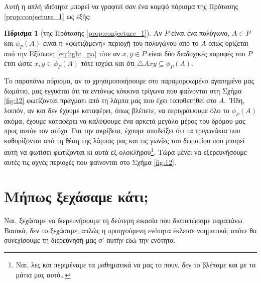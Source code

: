\documentclass[11pt,a4paper]{article}
\theoremstyle{definition}
\newtheorem{cor}{Πόρισμα}[section]
\begin{document}
	Αυτή η απλή ιδιότητα μπορεί να γραφτεί σαν ένα κομψό πόρισμα της Πρότασης \ref{prop:conjecture_1} ως εξής:
	\begin{cor}[της Πρότασης \ref{prop:conjecture_1}]\label{cor:conjecture_1}
		Αν $P$ είναι ένα πολύγωνο, $A\in P$ και $\phi_P(A)$ είναι η «φωτιζόμενη» περιοχή του πολυγώνου από το $A$ όπως ορίζεται από την Εξίσωση \eqref{eq:light_pa} τότε αν $x,y\in P$ είναι δύο διαδοχικές κορυφές του $P$ έτσι ώστε $x,y\in\phi_P(A)$ τότε ισχύει και ότι $\triangle Axy\subseteq\phi_P(A)$.
	\end{cor}
	
	Το παραπάνω πόρισμα, αν το χρησιμοποιήσουμε στο παραμορφωμένο αγαπημένο μας δωμάτιο, μας εγγυάται ότι τα εντόνως κόκκινα τρίγωνα που φαίνονται στη Σχήμα \ref{fig:12} φωτίζονται πράγματι από τη λάμπα μας που έχει τοποθετηθεί στο $A$. 'Ηδη, λοιπόν, αν και δεν έχουμε καταφέρει, όπως βλέπετε, να περιγράψουμε όλο το $\phi_P(A)$ ακόμα, έχουμε καταφέρει να καλύψουμε ένα αρκετά μεγάλο μέρος του δρόμου μας προς αυτόν τον στόχο. Για την ακρίβεια, έχουμε αποδείξει ότι τα τριγωνάκια που καθορίζονται από τη θέση της λάμπας μας και τις γωνίες του δωματίου που μπορεί αυτή να φωτίσει φωτίζονται κι αυτά εξ ολοκλήρου\footnote{Ναι, λες και περιμέναμε τα μαθηματικά να μας το πουν, δεν το βλέπαμε και με τα μάτια μας αυτό\ldots}. Τώρα μένει να εξερευνήσουμε αυτές τις αχνές περιοχές που φαίνονται στο Σχήμα \ref{fig:12}.
	
	\section{Μήπως ξεχάσαμε κάτι;}
	Ναι, ξεχάσαμε να διερευνήσουμε τη δεύτερη εικασία που διατυπώσαμε παραπάνω. Βασικά, δεν το ξεχάσαμε, απλώς η προηγούμενη ενότητα έκλεισε νοηματικά, οπότε θα συνεχίσουμε τη διερεύνησή μας σ' αυτήν εδώ την ενότητα.
\end{document}
